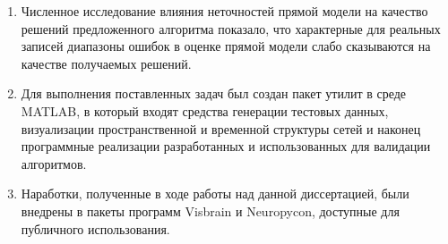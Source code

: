 \begin{enumerate}
  \item Численное исследование влияния неточностей прямой модели на качество решений
      предложенного алгоритма показало, что характерные для реальных записей
      диапазоны ошибок в оценке прямой модели слабо сказываются на качестве
      получаемых решений.
  \item Для выполнения поставленных задач был создан
      пакет утилит в среде MATLAB, в который входят средства генерации тестовых
      данных, визуализации пространственной и временной структуры сетей и наконец
      программные реализации разработанных и использованных для валидации алгоритмов.
  \item Наработки, полученные в ходе работы над данной диссертацией,
      были внедрены в пакеты программ Visbrain и Neuropycon, доступные для публичного
      использования.
\end{enumerate}
